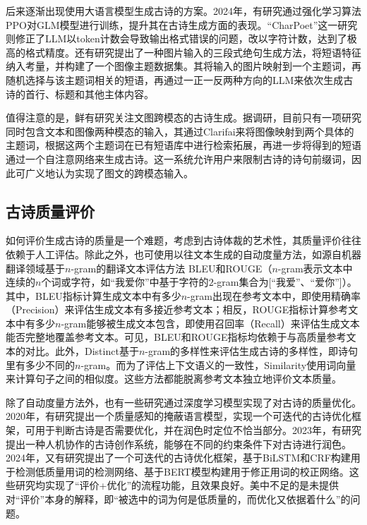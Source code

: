 后来逐渐出现使用大语言模型生成古诗的方案。2024年，有研究通过强化学习算法PPO对GLM模型进行训练，提升其在古诗生成方面的表现。“CharPoet”这一研究则修正了LLM以token计数会导致输出格式错误的问题，改以字符计数，达到了极高的格式精度。还有研究提出了一种图片输入的三段式绝句生成方法，将短语特征纳入考量，并构建了一个图像主题数据集。其将输入的图片映射到一个主题词，再随机选择与该主题词相关的短语，再通过一正一反两种方向的LLM来依次生成古诗的首行、标题和其他主体内容。

值得注意的是，鲜有研究关注文图跨模态的古诗生成。据调研，目前只有一项研究同时包含文本和图像两种模态的输入，其通过Clarifai来将图像映射到两个具体的主题词，根据这两个主题词在已有短语库中进行检索拓展，再进一步将得到的短语通过一个自注意网络来生成古诗。这一系统允许用户来限制古诗的诗句前缀词，因此可广义地认为实现了图文的跨模态输入。

\subsection{古诗质量评价}
如何评价生成古诗的质量是一个难题，考虑到古诗体裁的艺术性，其质量评价往往依赖于人工评估。除此之外，也可使用以往文本生成的自动度量方法，如源自机器翻译领域基于$n$-gram的翻译文本评估方法
BLEU和ROUGE（$n$-gram表示文本中连续的$n$个词或字符，如“我爱你”中基于字符的$2$-gram集合为[“我爱”、“爱你”]）。其中，BLEU指标计算生成文本中有多少$n$-gram出现在参考文本中，即使用精确率（Precision）来评估生成文本有多接近参考文本；相反，ROUGE指标计算参考文本中有多少$n$-gram能够被生成文本包含，即使用召回率（Recall）来评估生成文本能否完整地覆盖参考文本。可见，BLEU和ROUGE指标均依赖于与高质量参考文本的对比。此外，Distinct基于$n$-gram的多样性来评估生成古诗的多样性，即诗句里有多少不同的$n$-gram。而为了评估上下文语义的一致性，Similarity使用词向量来计算句子之间的相似度。这些方法都能脱离参考文本独立地评价文本质量。

除了自动度量方法外，也有一些研究通过深度学习模型实现了对古诗的质量优化。2020年，有研究提出一个质量感知的掩蔽语言模型，实现一个可迭代的古诗优化框架，可用于判断古诗是否需要优化，并在润色时定位不恰当部分。2023年，有研究提出一种人机协作的古诗创作系统，能够在不同的约束条件下对古诗进行润色。2024年，又有研究提出了一个可迭代的古诗优化框架，基于BiLSTM和CRF构建用于检测低质量用词的检测网络、基于BERT模型构建用于修正用词的校正网络。这些研究均实现了“评价+优化”的流程功能，且效果良好。美中不足的是未提供对“评价”本身的解释，即“被选中的词为何是低质量的，而优化又依据着什么”的问题。
